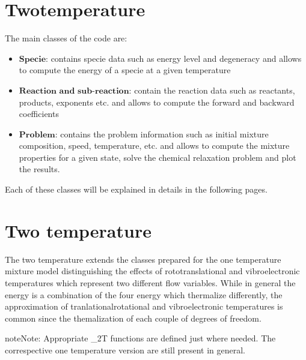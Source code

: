 \documentclass[letterpaper,10pt,english]{jupyterBook}
\begin{document}
\chapter{Two\sphinxhyphen{}temperature}
\label{\detokenize{2_Temperature/_2T_code_structure:two-temperature}}\label{\detokenize{2_Temperature/_2T_code_structure::doc}}
\sphinxAtStartPar
The main classes of the code are:
\begin{itemize}
\item {} 
\sphinxAtStartPar
\(\textbf{Specie}\): contains specie data such as energy level and degeneracy and allows to compute the energy of a specie at a given temperature

\item {} 
\sphinxAtStartPar
\(\textbf{Reaction and sub-reaction}\): contain the reaction data such as reactants, products, exponents etc. and allows to compute the forward and backward coefficients

\item {} 
\sphinxAtStartPar
\(\textbf{Problem}\): contains the problem information such as initial mixture composition, speed, temperature, etc. and allows to compute the mixture properties for a given state, solve the chemical relaxation problem and plot the results.

\end{itemize}

\sphinxAtStartPar
Each of these classes will be explained in details in the following pages.


\chapter{Two temperature}
\label{\detokenize{2_Temperature/_2T_code_structure:id1}}
\sphinxAtStartPar
The two temperature extends the classes prepared for the one temperature mixture model distinguishing the effects of roto\sphinxhyphen{}translational and vibro\sphinxhyphen{}electronic temperatures which represent two different flow variables. 
While in general the energy is a combination of the four energy which thermalize differently, the approximation of tranlational\sphinxhyphen{}rotational and vibro\sphinxhyphen{}electronic temperatures is common since the themalization of each couple of degrees of freedom. 

\begin{sphinxadmonition}{note}{Note:}
\sphinxAtStartPar
Appropriate \_2T functions are defined just where needed. The correspective one temperature version are still present in general.
\end{sphinxadmonition}
\end{document}

